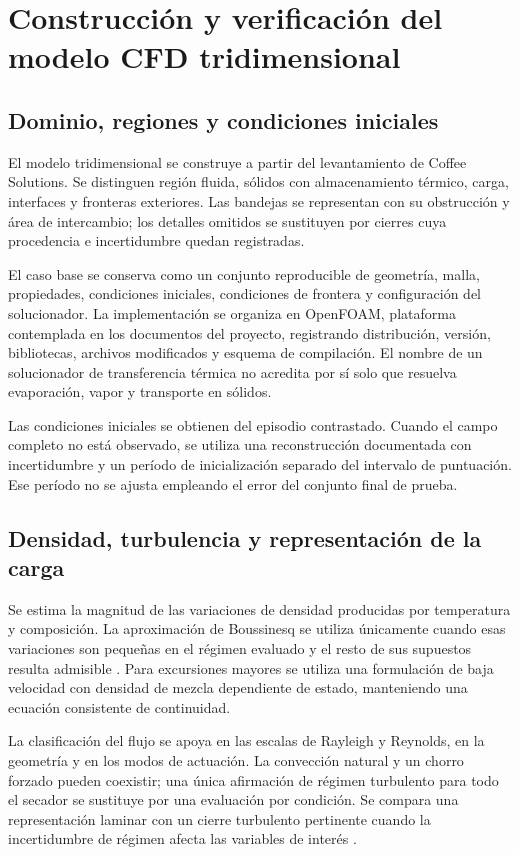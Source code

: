 \section{Construcción y verificación del modelo CFD tridimensional}
\label{met:cfd}

\subsection{Dominio, regiones y condiciones iniciales}

El modelo tridimensional se construye a partir del levantamiento de Coffee Solutions. Se distinguen región fluida, sólidos con almacenamiento térmico, carga, interfaces y fronteras exteriores. Las bandejas se representan con su obstrucción y área de intercambio; los detalles omitidos se sustituyen por cierres cuya procedencia e incertidumbre quedan registradas.

El caso base se conserva como un conjunto reproducible de geometría, malla, propiedades, condiciones iniciales, condiciones de frontera y configuración del solucionador. La implementación se organiza en OpenFOAM, plataforma contemplada en los documentos del proyecto, registrando distribución, versión, bibliotecas, archivos modificados y esquema de compilación. El nombre de un solucionador de transferencia térmica no acredita por sí solo que resuelva evaporación, vapor y transporte en sólidos.

Las condiciones iniciales se obtienen del episodio contrastado. Cuando el campo completo no está observado, se utiliza una reconstrucción documentada con incertidumbre y un período de inicialización separado del intervalo de puntuación. Ese período no se ajusta empleando el error del conjunto final de prueba.

\subsection{Densidad, turbulencia y representación de la carga}

Se estima la magnitud de las variaciones de densidad producidas por temperatura y composición. La aproximación de Boussinesq se utiliza únicamente cuando esas variaciones son pequeñas en el régimen evaluado y el resto de sus supuestos resulta admisible \cite{gray1976}. Para excursiones mayores se utiliza una formulación de baja velocidad con densidad de mezcla dependiente de estado, manteniendo una ecuación consistente de continuidad.

La clasificación del flujo se apoya en las escalas de Rayleigh y Reynolds, en la geometría y en los modos de actuación. La convección natural y un chorro forzado pueden coexistir; una única afirmación de régimen turbulento para todo el secador se sustituye por una evaluación por condición. Se compara una representación laminar con un cierre turbulento pertinente cuando la incertidumbre de régimen afecta las variables de interés \cite{launder1974,versteeg2007}.

